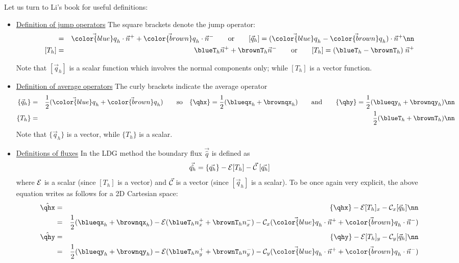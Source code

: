 Let us turn to Li's book for useful definitions:
\begin{itemize}
\item
\underline{Definition of jump operators} The square brackets denote the jump operator:
\begin{eqnarray}
[\vec{q}_h] &=& \vec{\color{blue}q}_h \cdot \vec{n}^+ + \vec{\color{brown} q}_h \cdot \vec{n}^- 
\qquad \text{or} \qquad 
[\vec{q}_h]= (\vec{\color{blue}q}_h - \vec{\color{brown}q}_h) \cdot \vec{n}^+    \nn\\
\left[T_h\right] &=& \blueT_h \vec{n}^+ + {\brownT}_h \vec{n}^-  \qquad \text{or} \qquad 
[T_h]=(\blueT_h  - \brownT_h ) \; \vec{n}^+ 
\end{eqnarray}

Note that $[\vec{q}_h]$ is a scalar function which involves the
normal components only; while $[T_h]$ is a vector function. 

\item
\underline{Definition of average operators} The curly brackets indicate the average operator
\begin{eqnarray}
\{ \vec{q}_h \}&=&\frac{1}{2}(\vec{\color{blue}q}_h + \vec{\color{brown}q}_h)
\qquad \text{so} \quad 
\{\qhx\}=\frac{1}{2}(\blueqx_h + \brownqx_h) 
\qquad \text{and}
\qquad  \{\qhy\}=\frac{1}{2}(\blueqy_h + \brownqy_h) \nn \\
\{T_h\}&=&\frac{1}{2}(\blueT_h + \brownT_h) \nn 
\end{eqnarray}
Note that $\{ \vec{q}_h \}$ is a vector, while 
$\{T_h\}$ is a scalar.

\item
\underline{Definitions of fluxes} In the LDG method the boundary flux $\vec{\hat{q}}$ is defined as 
\[
\vec{\hat{q_h}} = \{ \vec{q_h} \} -{\cal{E}} [T_h]- \vec{\cal{C}}\;  [\vec{q_h}] 
\]
where ${\cal{E}}$ is a scalar (since $[T_h]$ is a vector)
and $\vec{\cal C}$ is a vector (since $[\vec{q}_h]$ is a scalar).
To be once again very explicit, the above equation writes as follows for a 
2D Cartesian space:
\begin{eqnarray}
\hat{\qhx} 
&=& \{\qhx\} -{\cal{E}} [T_h]_x- {\cal{C}}_x  [\vec{q}_h] \nn\\
&=& \frac{1}{2}(\blueqx_h + \brownqx_h)
-{\cal{E}} (\blueT_h {n}_x^+ + \brownT_h {n}_x^-)
-{\cal{C}}_x  
(\vec{\color{blue}q}_h \cdot \vec{n}^+ +\vec{\color{brown}q}_h \cdot \vec{n}^-) \label{flux2Da}\\
\hat{\qhy} 
&=& \{\qhy\} -{\cal{E}} [T_h]_y- {\cal{C}}_y  [\vec{q}_h] \nn\\
&=& \frac{1}{2}(\blueqy_h + \brownqy_h)  
-{\cal{E}}  (\blueT_h {n}_y^+ + \brownT_h {n}_y^-)
-{\cal{C}}_y  (\vec{\color{blue} q}_h \cdot \vec{n}^+ +\vec{\color{brown}q}_h \cdot \vec{n}^-) \label{flux2Db}
\end{eqnarray}


\end{itemize}
